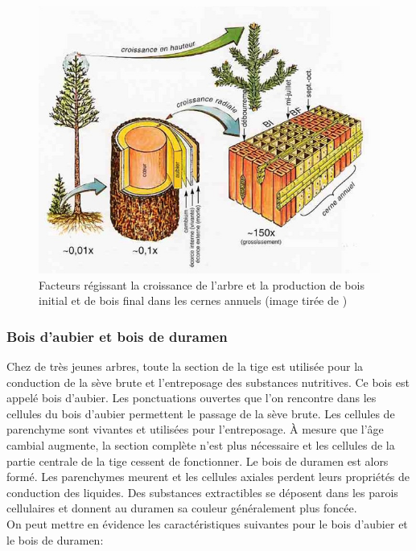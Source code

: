 \begin{figure}[h]
\centering
\includegraphics[width=\textwidth]{img/ch2_josza}
\caption{Facteurs régissant la croissance de l'arbre et la production de bois initial et de bois final dans les cernes annuels (image tirée de \cite{jozsa1994discussion})}
\label{josza}
\end{figure}

\subsubsection{Bois d'aubier et bois de duramen}
 
Chez de très jeunes arbres, toute la section de la tige est utilisée pour la conduction de la sève brute et l'entreposage des substances nutritives. Ce bois est appelé bois d'aubier. Les ponctuations ouvertes que l'on rencontre dans les cellules du bois d'aubier permettent le passage de la sève brute. Les cellules de parenchyme sont vivantes et utilisées pour l'entreposage. À mesure que l'âge cambial augmente, la section complète n'est plus nécessaire et les cellules de la partie centrale de la tige cessent de fonctionner. Le bois de duramen est alors formé. Les parenchymes meurent et les cellules axiales perdent leurs propriétés de conduction des liquides. Des substances extractibles se déposent dans les parois cellulaires et donnent au duramen sa couleur généralement plus foncée.\\

On peut mettre en évidence les caractéristiques suivantes pour le bois d'aubier et le bois de duramen: 

